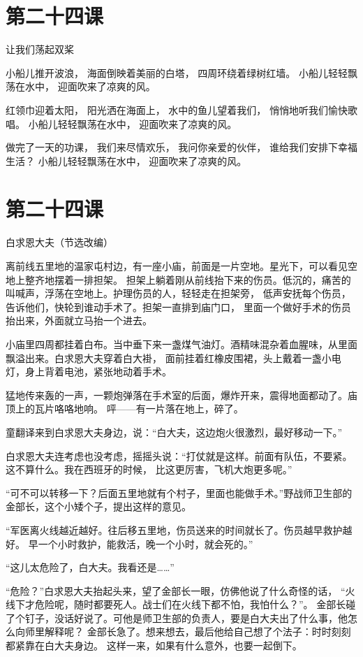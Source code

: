 \documentclass[12pt,UTF8]{ctexbook}
\begin{document}
\section{第二十四课}

让我们荡起双桨

小船儿推开波浪，
海面倒映着美丽的白塔，
四周环绕着绿树红墙。
小船儿轻轻飘荡在水中，
迎面吹来了凉爽的风。

红领巾迎着太阳，
阳光洒在海面上，
水中的鱼儿望着我们，
悄悄地听我们愉快歌唱。
小船儿轻轻飘荡在水中，
迎面吹来了凉爽的风。

做完了一天的功课，
我们来尽情欢乐，
我问你亲爱的伙伴，
谁给我们安排下幸福生活？
小船儿轻轻飘荡在水中，
迎面吹来了凉爽的风。

\section{第二十四课}

白求恩大夫（节选改编）

离前线五里地的温家屯村边，有一座小庙，前面是一片空地。星光下，可以看见空地上整齐地摆着一排担架。
担架上躺着刚从前线抬下来的伤员。低沉的，痛苦的叫喊声，浮荡在空地上。护理伤员的人，轻轻走在担架旁，
低声安抚每个伤员，告诉他们，快轮到谁动手术了。担架一直排到庙门口，
里面一个做好手术的伤员抬出来，外面就立马抬一个进去。

小庙里四周都挂着白布。当中垂下来一盏煤气油灯。酒精味混杂着血腥味，从里面飘溢出来。白求恩大夫穿着白大褂，
面前挂着红橡皮围裙，头上戴着一盏小电灯，身上背着电池，紧张地动着手术。

猛地传来轰的一声，一颗炮弹落在手术室的后面，爆炸开来，震得地面都动了。庙顶上的瓦片咯咯地响。
呯——有一片落在地上，碎了。

童翻译来到白求恩大夫身边，说：“白大夫，这边炮火很激烈，最好移动一下。”

白求恩大夫连考虑也没考虑，摇摇头说：“打仗就是这样。前面有队伍，不要紧。这不算什么。我在西班牙的时候，
比这更厉害，飞机大炮更多呢。”

“可不可以转移一下？后面五里地就有个村子，里面也能做手术。”野战师卫生部的金部长，这个小矮个子，提出这样的意见。

“军医离火线越近越好。往后移五里地，伤员送来的时间就长了。伤员越早救护越好。
早一个小时救护，能救活，晚一个小时，就会死的。”

“这儿太危险了，白大夫。我看还是……”

“危险？”白求恩大夫抬起头来，望了金部长一眼，仿佛他说了什么奇怪的话，
“火线下才危险呢，随时都要死人。战士们在火线下都不怕，我怕什么？”。
金部长碰了个钉子，没话好说了。可他是师卫生部的负责人，要是白大夫出了什么事，他怎么向师里解释呢？
金部长急了。想来想去，最后他给自己想了个法子：时时刻刻都紧靠在白大夫身边。
这样一来，如果有什么意外，也要一起倒下。
\end{document}
